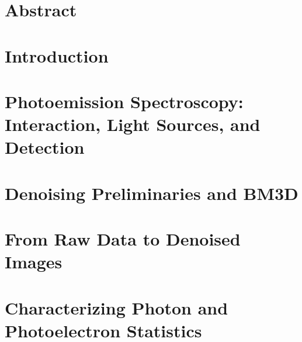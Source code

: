 \documentclass[a4paper,11pt,twoside,openany]{book}
\begin{document}

\chapter*{Abstract}

\tableofcontents

\printglossary[style=tree, type=\acronymtype, title=List of Acronyms]
\glsaddallunused[symbols]
\printglossary[type=symbols, style=tree, title=List of Symbols, nonumberlist]

\printglossary[nonumberlist]
\glsunsetall
\glsresetall

% 

\chapter{Introduction}


\glsresetall

\chapter[Photoemission Spectroscopy: Interaction, Light Sources, and Detection]{Photoemission Spectroscopy:\\Interaction, Light Sources, and Detection}\label{ch:pes}


\chapter{Denoising Preliminaries and BM3D}\label{ch:denoising}


\chapter{From Raw Data to Denoised Images}\label{ch:datasets_bm3d}


\chapter{Characterizing Photon and Photoelectron Statistics}\label{ch:pes-statistics}

\end{document}
